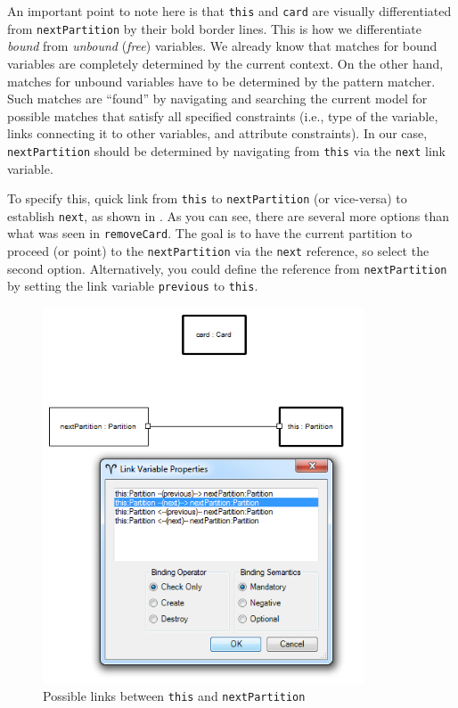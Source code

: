 \begin{stepbystep}
An important point to note here is that \texttt{this} and \texttt{card} are visually differentiated from \texttt{nextPartition} by
their bold border lines. This is how we differentiate \emph{bound} from \emph{unbound} (\emph{free}) variables. We already know that matches for bound
variables are completely determined by the current context. On the other hand, matches for unbound variables have to be determined by the pattern matcher. Such
matches are ``found'' by navigating and searching the current model for possible matches that satisfy all specified constraints (i.e., type of the variable,
links connecting it to other variables, and attribute constraints). In our case, \texttt{nextPartition} should be determined by navigating from
\texttt{this} via the \texttt{next} link variable.

\vspace{0.5cm}

\item To specify this, quick link from \texttt{this} to \texttt{nextPartition} (or vice-versa) to establish
\texttt{next}, as shown in . As you can see, there are several more options than what was seen in
\texttt{removeCard}. The goal is to have the current partition to proceed (or point) to the \texttt{nextPartition} via the \texttt{next} reference, so select
the second option. Alternatively, you could define the reference from \texttt{nextPartition} by setting the link variable \texttt{previous} to \texttt{this}.

\begin{figure}[htbp]
\begin{center}
  \includegraphics[width=0.85\textwidth]{../../org.moflon.doc.handbook.03_storyDiagrams/04_checkCard/visCheImages/ea_promoteLinkProperties}
  \caption{Possible links between \texttt{this} and \texttt{nextPartition}}
  \label{ea:sdm_check_link_variable}
\end{center}
\end{figure}


\end{stepbystep}
